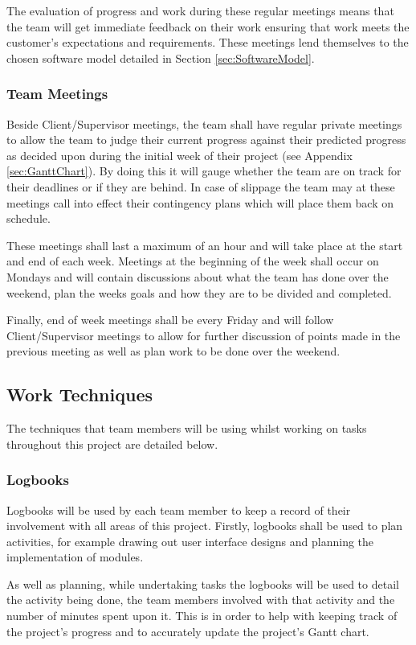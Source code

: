 The evaluation of progress and work during these regular meetings means that the team will get immediate feedback on their work ensuring that work meets the customer's expectations and requirements. These meetings lend themselves to the chosen software model detailed in Section \ref{sec:SoftwareModel}.

\subsubsection{Team Meetings}
\label{sec:TeamMeetings}
Beside Client/Supervisor meetings, the team shall have regular private meetings to allow the team to judge their current progress against their predicted progress as decided upon during the initial week of their project (see Appendix \ref{sec:GanttChart}). By doing this it will gauge whether the team are on track for their deadlines or if they are behind. In case of slippage the team may at these meetings call into effect their contingency plans which will place them back on schedule. 

These meetings shall last a maximum of an hour and will take place at the start and end of each week. Meetings at the beginning of the week shall occur on Mondays and will contain discussions about what the team has done over the weekend, plan the weeks goals and how they are to be divided and completed.

Finally, end of week meetings shall be every Friday and will follow Client/Supervisor meetings to allow for further discussion of points made in the previous meeting as well as plan work to be done over the weekend.

\subsection{Work Techniques}
The techniques that team members will be using whilst working on tasks throughout this project are detailed below.

\subsubsection{Logbooks}
Logbooks will be used by each team member to keep a record of their involvement with all areas of this project. Firstly, 
logbooks shall be used to plan activities, for example drawing out user interface designs and planning the implementation of modules.

As well as planning, while undertaking tasks the logbooks will be used to detail
the activity being done, the team members involved with that activity and the
number of minutes spent upon it. This is in order to help with keeping track of
the project's progress and to accurately update the project’s Gantt chart.

